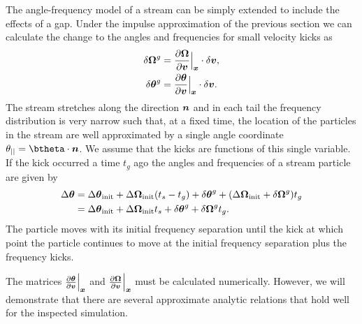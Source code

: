 \documentclass[useAMS,usenatbib,fleqn,a4paper]{mn2e}
\newcommand{\bs}[1]{\bmath{#1}}
\begin{document}
The angle-frequency model of a stream can be simply extended to include the effects of a gap. Under the impulse approximation of the previous section we can calculate the change to the angles and frequencies for small velocity kicks as
\begin{equation}
\begin{split}
\delta \boldsymbol{\Omega}^g &= \frac{\upartial \boldsymbol{\Omega}}{\upartial \bs{v}}\Big|_{\bs{x}}\cdot \delta\bs{v},\\
\delta \bs{\theta}^g &= \frac{\upartial \bs{\theta}}{\upartial \bs{v}}\Big|_{\bs{x}}\cdot \delta\bs{v}.
\end{split}
\end{equation}
The stream stretches along the direction $\bs{n}$ and in each tail the frequency distribution is very narrow such that, at a fixed time, the location of the particles in the stream are well approximated by a single angle coordinate $\theta_{||}=\btheta\cdot\bs{n}$. We assume that the kicks are functions of this single variable. If the kick occurred a time $t_g$ ago the angles and frequencies of a stream particle are given by
\begin{equation}
\begin{split}
\Delta\bs{\theta} &= \Delta\bs{\theta}_{\rm init}+\Delta\boldsymbol{\Omega}_{\rm init}(t_s-t_g)+\delta\bs{\theta}^g+(\Delta\boldsymbol{\Omega}_{\rm init}+\delta\boldsymbol{\Omega}^g)t_g \\&= \Delta\bs{\theta}_{\rm init}+\Delta\boldsymbol{\Omega}_{\rm init}t_s+\delta\bs{\theta}^g+\delta\boldsymbol{\Omega}^g t_g.
\end{split}
\end{equation}
The particle moves with its initial frequency separation until the kick at which point the particle continues to move at the initial frequency separation plus the frequency kicks.

The matrices $\frac{\upartial \bs{\theta}}{\upartial \bs{v}}\Big|_{\bs{x}}$ and $\frac{\upartial \bs{\Omega}}{\upartial \bs{v}}\Big|_{\bs{x}}$ must be calculated numerically. However, we will demonstrate that there are several approximate analytic relations that hold well for the inspected simulation.
\end{document}
